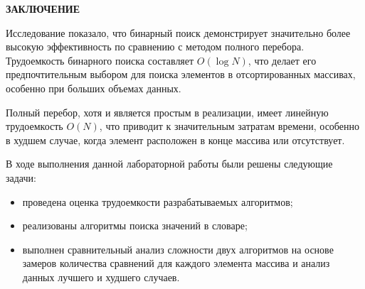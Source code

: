 \begin{center}
    \textbf{ЗАКЛЮЧЕНИЕ}
\end{center}

Исследование показало, что бинарный поиск демонстрирует значительно более высокую эффективность по сравнению с методом полного перебора. Трудоемкость бинарного поиска составляет $O(\log N)$, что делает его предпочтительным выбором для поиска элементов в отсортированных массивах, особенно при больших объемах данных.

Полный перебор, хотя и является простым в реализации, имеет линейную трудоемкость $O(N)$, что приводит к значительным затратам времени, особенно в худшем случае, когда элемент расположен в конце массива или отсутствует.

\vspace{5mm}

В ходе выполнения данной лабораторной работы были решены следующие задачи:
\begin{itemize}
    \item проведена оценка трудоемкости разрабатываемых алгоритмов;
    \item реализованы алгоритмы поиска значений в словаре;
    \item выполнен сравнительный анализ сложности двух алгоритмов на основе замеров количества сравнений для каждого элемента массива и анализ данных лучшего и худшего случаев.
\end{itemize}